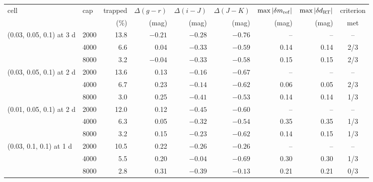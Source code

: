 \begin{tabular}{llrrrrrrc}
\toprule
cell & cap & trapped & $\Delta(g-r)$ & $\Delta(i-J)$ & $\Delta(J-K)$ & $\max|\delta m_{\rm ref}|$ & $\max|\delta d_{\rm RT}|$ & criterion \\
 & & (\%) & (mag) & (mag) & (mag) & (mag) & (mag) & met \\
\midrule
(0.03, 0.05, 0.1) at 3 d & 2000 & 13.8 & $-0.21$ & $-0.28$ & $-0.76$ & -- & -- & -- \\
 & 4000 & 6.6 & 0.04 & $-0.33$ & $-0.59$ & 0.14 & 0.14 & 2/3 \\
 & 8000 & 3.2 & $-0.04$ & $-0.33$ & $-0.58$ & 0.15 & 0.15 & 2/3 \\
(0.03, 0.05, 0.1) at 2 d & 2000 & 13.6 & 0.13 & $-0.16$ & $-0.67$ & -- & -- & -- \\
 & 4000 & 6.7 & 0.23 & $-0.14$ & $-0.62$ & 0.06 & 0.05 & 2/3 \\
 & 8000 & 3.0 & 0.25 & $-0.41$ & $-0.53$ & 0.14 & 0.14 & 1/3 \\
(0.01, 0.05, 0.1) at 2 d & 2000 & 12.0 & 0.12 & $-0.45$ & $-0.60$ & -- & -- & -- \\
 & 4000 & 6.3 & 0.05 & $-0.32$ & $-0.54$ & 0.35 & 0.35 & 1/3 \\
 & 8000 & 3.2 & 0.15 & $-0.23$ & $-0.62$ & 0.14 & 0.15 & 1/3 \\
(0.03, 0.1, 0.1) at 1 d & 2000 & 10.5 & 0.22 & $-0.26$ & $-0.26$ & -- & -- & -- \\
 & 4000 & 5.5 & 0.20 & $-0.04$ & $-0.69$ & 0.30 & 0.30 & 1/3 \\
 & 8000 & 2.8 & 0.31 & $-0.39$ & $-0.13$ & 0.21 & 0.21 & 0/3 \\
\bottomrule
\end{tabular}
